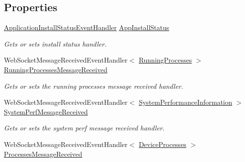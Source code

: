 \subsection*{Properties}
\begin{DoxyCompactItemize}
\item 
\hyperlink{namespace_microsoft_1_1_tools_1_1_windows_device_portal_a090bafbb778fef68cd8b97d373800c99}{Application\+Install\+Status\+Event\+Handler} \hyperlink{class_microsoft_1_1_tools_1_1_windows_device_portal_1_1_device_portal_a76df947fcd561b40b00bd870a90d2ee7}{App\+Install\+Status}
\begin{DoxyCompactList}\small\item\em Gets or sets install status handler. \end{DoxyCompactList}\item 
Web\+Socket\+Message\+Received\+Event\+Handler$<$ \hyperlink{class_microsoft_1_1_tools_1_1_windows_device_portal_1_1_device_portal_1_1_running_processes}{Running\+Processes} $>$ \hyperlink{class_microsoft_1_1_tools_1_1_windows_device_portal_1_1_device_portal_a89511b52daa5ca50cfff9f748bfa3959}{Running\+Processes\+Message\+Received}
\begin{DoxyCompactList}\small\item\em Gets or sets the running processes message received handler. \end{DoxyCompactList}\item 
Web\+Socket\+Message\+Received\+Event\+Handler$<$ \hyperlink{class_microsoft_1_1_tools_1_1_windows_device_portal_1_1_device_portal_1_1_system_performance_information}{System\+Performance\+Information} $>$ \hyperlink{class_microsoft_1_1_tools_1_1_windows_device_portal_1_1_device_portal_a631054e4696dcd542ce9ac5a46a2441d}{System\+Perf\+Message\+Received}
\begin{DoxyCompactList}\small\item\em Gets or sets the system perf message received handler. \end{DoxyCompactList}\item 
Web\+Socket\+Message\+Received\+Event\+Handler$<$ \hyperlink{class_microsoft_1_1_tools_1_1_windows_device_portal_1_1_device_portal_1_1_device_processes}{Device\+Processes} $>$ \hyperlink{class_microsoft_1_1_tools_1_1_windows_device_portal_1_1_device_portal_aaf3af8d06d8a76c44d7dcaa64b576309}{Processes\+Message\+Received}

\end{DoxyCompactItemize}
